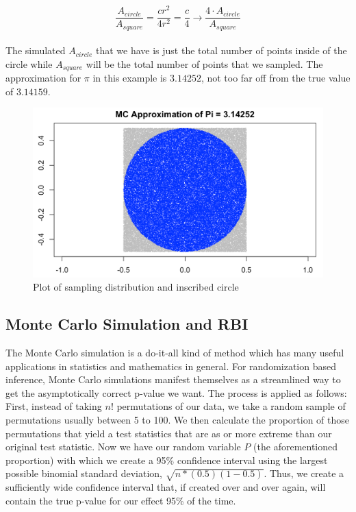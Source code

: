$$
\frac{A_{circle}}{A_{square}} = \frac{cr^2}{4r^2} = \frac{c}{4}\longrightarrow\frac{4\cdot A_{circle}}{A_{square}}
$$
\\
The simulated $A_{circle}$ that we have is just the total number of points inside of the circle while $A_{square}$ will be the total number of points that we sampled. The approximation for $\pi$ in this example is $3.14252$, not too far off from the true value of $3.14159$.

\begin{figure}[htpb!] %
    \centering %
\includegraphics[scale=0.4]{figure/monteCarloCircle.png} %
    \caption{Plot of sampling distribution and inscribed circle} %
    \label{fig:my_label} %
\end{figure}

\subsection{Monte Carlo Simulation and RBI}

The Monte Carlo simulation is a do-it-all kind of method which has many useful applications in statistics and mathematics in general. For randomization based inference, Monte Carlo simulations manifest themselves as a streamlined way to get the asymptotically correct p-value we want. The process is applied as follows: First, instead of taking $n!$ permutations of our data, we take a random sample of permutations usually between 5 to 100. We then calculate the proportion of those permutations that yield a test statistics that are as or more extreme than our original test statistic. Now we have our random variable $P$ (the aforementioned proportion) with which we create a 95\% confidence interval using the largest possible binomial standard deviation, $\sqrt{n*(0.5)(1-0.5)}$. Thus, we create a sufficiently wide confidence interval that, if created over and over again, will contain the true p-value for our effect 95\% of the time. 
